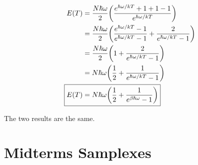 \documentclass[9pt,a4paper,twocolumn]{article}
\begin{document}
\begin{enumerate}[(a)]
\begin{align}
	E(T) &= \frac{N\hbar\omega}{2} \qty(\frac{e^{\hbar\omega/kT}+1+1-1}{e^{\hbar\omega/kT}}) \nonumber \\
	&= \frac{N\hbar\omega}{2}\qty(\frac{e^{\hbar\omega/kT}-1}{e^{\hbar\omega/kT}-1}+\frac{2}{e^{\hbar\omega/kT}-1}) \nonumber \\
    &= \frac{N\hbar\omega}{2}\qty(1+\frac{2}{e^{\hbar\omega/kT}-1}) \nonumber \\
    &= N\hbar\omega\qty(\frac{1}{2}+\frac{1}{e^{\hbar\omega/kT}-1}) \nonumber \\
	\Aboxed{    
	    E(T) &= N\hbar\omega\qty(\frac{1}{2}+\frac{1}{e^{\beta\hbar\omega}-1})
	 } \label{eq:answer-c}
\end{align}

The two results are the same.

\end{enumerate}

\section{Midterms Samplexes}
\end{document}
